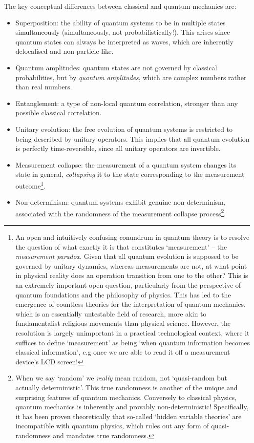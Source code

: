The key conceptual differences between classical and quantum mechanics are:
\begin{itemize}
	\item Superposition: the ability of quantum systems to be in multiple states simultaneously (simultaneously, not probabilistically!). This arises since quantum states can always be interpreted as waves, which are inherently delocalised and non-particle-like.
	\item Quantum amplitudes: quantum states are not governed by classical probabilities, but by \textit{quantum amplitudes}, which are complex numbers rather than real numbers.
	\item Entanglement: a type of non-local quantum correlation, stronger than any possible classical correlation.
	\item Unitary evolution: the free evolution of quantum systems is restricted to being described by unitary operators. This implies that all quantum evolution is perfectly time-reversible, since all unitary operators are invertible.
	\item Measurement collapse: the measurement of a quantum system changes its state in general, \textit{collapsing} it to the state corresponding to the measurement outcome\footnote{An open and intuitively confusing conundrum in quantum theory is to resolve the question of what exactly it is that constitutes `measurement' -- the \textit{measurement paradox}. Given that all quantum evolution is supposed to be governed by unitary dynamics, whereas measurements are not, at what point in physical reality does an operation transition from one to the other? This is an extremely important open question, particularly from the perspective of quantum foundations and the philosophy of physics. This has led to the emergence of countless theories for the interpretation of quantum mechanics, which is an essentially untestable field of research, more akin to fundamentalist religious movements than physical science. However, the resolution is largely unimportant in a practical technological context, where it suffices to define `measurement' as being `when quantum information becomes classical information', e.g once we are able to read it off a measurement device's LCD screen!}.
	\item Non-determinism: quantum systems exhibit genuine non-determinism, associated with the randomness of the measurement collapse process\footnote{When we say `random' we \textit{really} mean random, not `quasi-random but actually deterministic'. This true randomness is another of the unique and surprising features of quantum mechanics. Conversely to classical physics, quantum mechanics is inherently and provably non-deterministic! Specifically, it has been proven theoretically \cite{bib:BellNoHiddenVariables} that so-called `hidden variable theories' are incompatible with quantum physics, which rules out any form of quasi-randomness and mandates true randomness.}.

\end{itemize}
